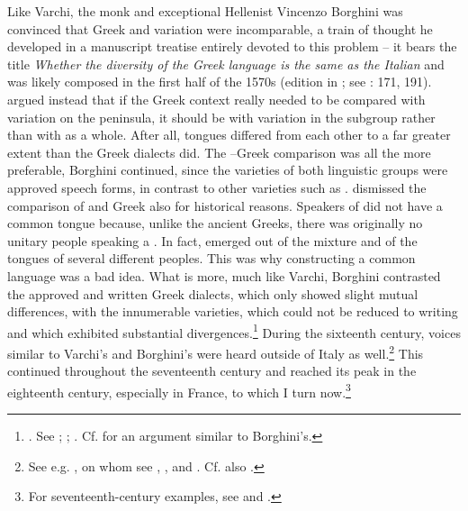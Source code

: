 Like Varchi, the  monk and exceptional Hellenist Vincenzo Borghini was convinced that Greek and  variation were incomparable, a train of thought he developed in a manuscript treatise entirely devoted to this problem – it bears the title \textit{Whether the diversity of the Greek language is the same as the Italian} and was likely composed in the first half of the 1570s (edition in \citealt{Borghini1971}; see \citealt{Alinei1984}: 171, 191). \citet[335]{Borghini1971} argued instead that if the Greek context really needed to be compared with variation on the  peninsula, it should be with variation in the  subgroup rather than with  as a whole. After all,  tongues differed from each other to a far greater extent than the Greek dialects did. The –Greek comparison was all the more preferable, Borghini continued, since the varieties of both linguistic groups were approved speech forms, in contrast to other  varieties such as . \citet[338--340]{Borghini1971} dismissed the comparison of  and Greek also for historical reasons. Speakers of  did not have a common tongue because, unlike the ancient Greeks, there was originally no unitary  people speaking a . In fact,  emerged out of the mixture and  of the tongues of several different peoples. This was why constructing a common  language was a bad idea. What is more, much like Varchi, Borghini contrasted the approved and written Greek dialects, which only showed slight mutual differences, with the innumerable  varieties, which could not be reduced to writing and which exhibited substantial divergences.\footnote{\citet[341]{Borghini1971}. See \citet[171]{Alinei1984}; \citet[210]{Trovato1984}; \citet[32--37]{Beninca1988}. Cf. \citet[253--254]{Salviati1588} for an argument similar to Borghini’s.} During the sixteenth century, voices similar to Varchi’s and Borghini’s were heard outside of Italy as well.\footnote{See e.g. \citet[595--596]{Wolf1578}, on whom see \citet{Von1856}, \citet[58–59]{Jellinek1898, Jellinek1913}, and \citet[esp. 214--218]{Mattheier2003}. Cf. also \citet[xiii.\textsc{\textsuperscript{v}}]{Palsgrave1530}.} This continued throughout the seventeenth century and reached its peak in the eighteenth century, especially in France, to which I turn now.\footnote{For seventeenth-century examples, see \citet[458--459]{Mambrun1661} and \citet[146--147]{Morhof1685}.}

